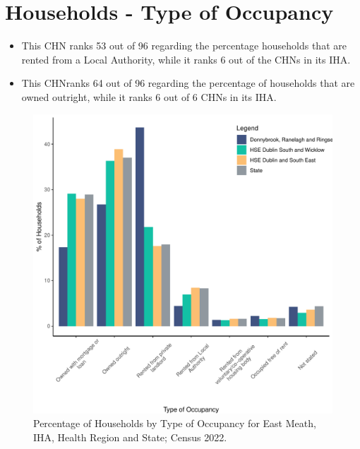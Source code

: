 \documentclass{article}
\begin{document}
\section{Households - Type of Occupancy}\label{sect:Households}
\begin{itemize}
\item This CHN ranks  53 out of 96 regarding the percentage households that are rented from a Local Authority, while it ranks  6 out of the CHNs in its IHA. 
\item This CHNranks  64 out of 96 regarding the percentage of households that are owned outright, while it ranks   6 out of 6 CHNs in its IHA.
\end{itemize}
\begin{figure}[H]
	\centering
	\includegraphics[width = 140mm]{../figures/HouseholdsED.pdf}
	\caption{Percentage of Households by Type of Occupancy for East Meath, IHA, Health Region and State; Census 2022.}
	\label{fig:vbnv}
	\end{figure}
\end{document}
